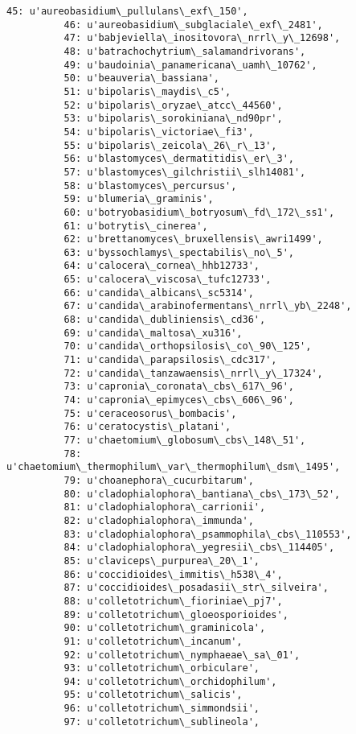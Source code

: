\documentclass[11pt]{article}
\begin{document}
\begin{Verbatim}[commandchars=\\\{\}]
          45: u'aureobasidium\_pullulans\_exf\_150',
          46: u'aureobasidium\_subglaciale\_exf\_2481',
          47: u'babjeviella\_inositovora\_nrrl\_y\_12698',
          48: u'batrachochytrium\_salamandrivorans',
          49: u'baudoinia\_panamericana\_uamh\_10762',
          50: u'beauveria\_bassiana',
          51: u'bipolaris\_maydis\_c5',
          52: u'bipolaris\_oryzae\_atcc\_44560',
          53: u'bipolaris\_sorokiniana\_nd90pr',
          54: u'bipolaris\_victoriae\_fi3',
          55: u'bipolaris\_zeicola\_26\_r\_13',
          56: u'blastomyces\_dermatitidis\_er\_3',
          57: u'blastomyces\_gilchristii\_slh14081',
          58: u'blastomyces\_percursus',
          59: u'blumeria\_graminis',
          60: u'botryobasidium\_botryosum\_fd\_172\_ss1',
          61: u'botrytis\_cinerea',
          62: u'brettanomyces\_bruxellensis\_awri1499',
          63: u'byssochlamys\_spectabilis\_no\_5',
          64: u'calocera\_cornea\_hhb12733',
          65: u'calocera\_viscosa\_tufc12733',
          66: u'candida\_albicans\_sc5314',
          67: u'candida\_arabinofermentans\_nrrl\_yb\_2248',
          68: u'candida\_dubliniensis\_cd36',
          69: u'candida\_maltosa\_xu316',
          70: u'candida\_orthopsilosis\_co\_90\_125',
          71: u'candida\_parapsilosis\_cdc317',
          72: u'candida\_tanzawaensis\_nrrl\_y\_17324',
          73: u'capronia\_coronata\_cbs\_617\_96',
          74: u'capronia\_epimyces\_cbs\_606\_96',
          75: u'ceraceosorus\_bombacis',
          76: u'ceratocystis\_platani',
          77: u'chaetomium\_globosum\_cbs\_148\_51',
          78: u'chaetomium\_thermophilum\_var\_thermophilum\_dsm\_1495',
          79: u'choanephora\_cucurbitarum',
          80: u'cladophialophora\_bantiana\_cbs\_173\_52',
          81: u'cladophialophora\_carrionii',
          82: u'cladophialophora\_immunda',
          83: u'cladophialophora\_psammophila\_cbs\_110553',
          84: u'cladophialophora\_yegresii\_cbs\_114405',
          85: u'claviceps\_purpurea\_20\_1',
          86: u'coccidioides\_immitis\_h538\_4',
          87: u'coccidioides\_posadasii\_str\_silveira',
          88: u'colletotrichum\_fioriniae\_pj7',
          89: u'colletotrichum\_gloeosporioides',
          90: u'colletotrichum\_graminicola',
          91: u'colletotrichum\_incanum',
          92: u'colletotrichum\_nymphaeae\_sa\_01',
          93: u'colletotrichum\_orbiculare',
          94: u'colletotrichum\_orchidophilum',
          95: u'colletotrichum\_salicis',
          96: u'colletotrichum\_simmondsii',
          97: u'colletotrichum\_sublineola',

\end{Verbatim}
\end{document}
